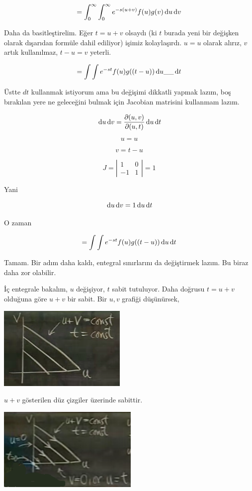 \documentclass[12pt,fleqn]{article}\usepackage{../../common}
\begin{document}
$$ = \int_{0}^{\infty} \int_{0}^{\infty} e^{-s(u+v)} f(u)g(v) \,\mathrm{d} u \,\mathrm{d} v $$

Daha da basitleştirelim. Eğer $t=u+v$ olsaydı (ki $t$ burada yeni bir değişken
olarak dışarıdan formüle dahil ediliyor) işimiz kolaylaşırdı. $u=u$ olarak
alırız, $v$ artık kullanılmaz, $t-u = v$ yeterli.

$$ = \int \int  e^{-st} f(u)g((t-u)) \,\mathrm{d} u \_\_ \,\mathrm{d} t $$

Üstte $dt$ kullanmak istiyorum ama bu değişimi dikkatli yapmak lazım, boş
bırakılan yere ne geleceğini bulmak için Jacobian matrisini kullanmam lazım.

$$ \,\mathrm{d} u \,\mathrm{d} v = \frac{\partial(u,v)}{\partial(u,t)} \,\mathrm{d} u \,\mathrm{d} t $$

$$ u = u $$

$$ v = t - u $$

$$
J = \left|\begin{array}{rr} 1 & 0 \\ -1 &1 \end{array}\right| = 1
$$

Yani 

$$ \,\mathrm{d} u \,\mathrm{d} v = 1 \,\mathrm{d} u \,\mathrm{d} t $$

O zaman 

$$ = \int \int e^{-st} f(u)g((t-u)) \,\mathrm{d} u \,\mathrm{d} t $$

Tamam. Bir adım daha kaldı, entegral sınırlarını da değiştirmek lazım. Bu biraz
daha zor olabilir.

İç entegrale bakalım, $u$ değişiyor, $t$ sabit tutuluyor. Daha doğrusu
$t=u+v$ olduğuna göre $u+v$ bir sabit. Bir $u,v$ grafiği düşünürsek, 

\includegraphics[height=4cm]{21_1.png}

$u+v$ gösterilen düz çizgiler üzerinde sabittir. 

\includegraphics[height=4cm]{21_2.png}
\end{document}
